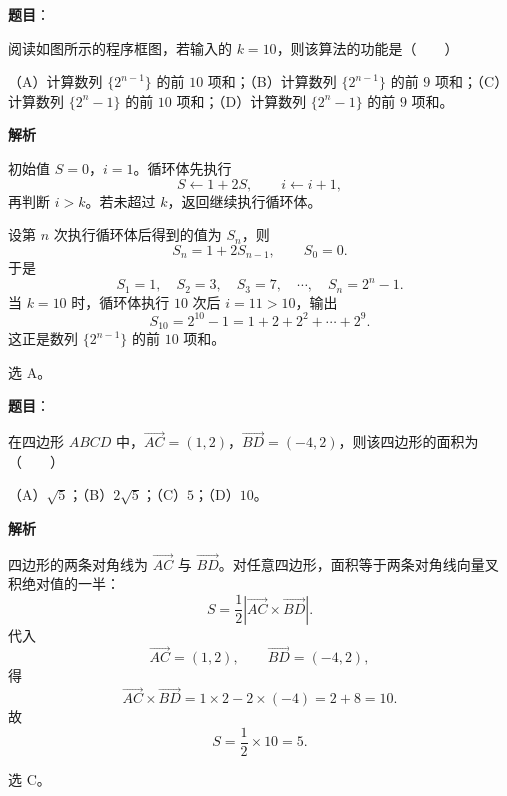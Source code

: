 \begin{answer}

\textbf{题目}：

阅读如图所示的程序框图，若输入的 $k=10$，则该算法的功能是\mbox{（　　）}
\nopagebreak[4]
\begin{center}\end{center}
\nopagebreak[4]
（A）计算数列 $\{2^{n-1}\}$ 的前 $10$ 项和；（B）计算数列 $\{2^{n-1}\}$ 的前 $9$ 项和；（C）计算数列 $\{2^n-1\}$ 的前 $10$ 项和；（D）计算数列 $\{2^n-1\}$ 的前 $9$ 项和。

\textbf{解析}

初始值 $S=0$，$i=1$。循环体先执行
\nopagebreak[4]
\[S\leftarrow1+2S,\qquad i\leftarrow i+1,\]
再判断 $i>k$。若未超过 $k$，返回继续执行循环体。

设第 $n$ 次执行循环体后得到的值为 $S_n$，则
\nopagebreak[4]
\[S_n=1+2S_{n-1},\qquad S_0=0.\]
于是
\nopagebreak[4]
\[S_1=1,\quad S_2=3,\quad S_3=7,\quad\cdots,\quad S_n=2^n-1.\]
当 $k=10$ 时，循环体执行 $10$ 次后 $i=11>10$，输出
\nopagebreak[4]
\[S_{10}=2^{10}-1=1+2+2^2+\cdots+2^9.\]
这正是数列 $\{2^{n-1}\}$ 的前 $10$ 项和。

选 A。


\end{answer}
\begin{answer}

\textbf{题目}：

在四边形 $ABCD$ 中，$\overrightarrow{AC}=(1,2)$，$\overrightarrow{BD}=(-4,2)$，则该四边形的面积为\mbox{（　　）}

（A）$\sqrt5$；（B）$2\sqrt5$；（C）$5$；（D）$10$。

\textbf{解析}

四边形的两条对角线为 $\overrightarrow{AC}$ 与 $\overrightarrow{BD}$。对任意四边形，面积等于两条对角线向量叉积绝对值的一半：
\nopagebreak[4]
\[S=\frac12\left|\overrightarrow{AC}\times\overrightarrow{BD}\right|.\]
代入
\nopagebreak[4]
\[\overrightarrow{AC}=(1,2),\qquad\overrightarrow{BD}=(-4,2),\]
得
\nopagebreak[4]
\[\overrightarrow{AC}\times\overrightarrow{BD}=1\times2-2\times(-4)=2+8=10.\]
故
\nopagebreak[4]
\[S=\frac12\times10=5.\]

选 C。


\end{answer}
